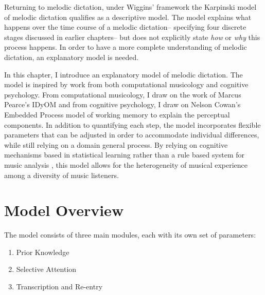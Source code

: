 \documentclass[12pt,]{book}
\providecommand{\tightlist}{%
  \setlength{\itemsep}{0pt}\setlength{\parskip}{0pt}}
\begin{document}
Returning to melodic dictation, under Wiggins' framework the Karpinski model of melodic dictation \citep{karpinskiAuralSkillsAcquisition2000, karpinskiModelMusicPerception1990} qualifies as a descriptive model.
The model explains what happens over the time course of a melodic dictation-- specifying four discrete stages discussed in earlier chapters-- but does not explicitly state \emph{how} or \emph{why} this process happens.
In order to have a more complete understanding of melodic dictation, an explanatory model is needed.

In this chapter, I introduce an explanatory model of melodic dictation.
The model is inspired by work from both computational musicology and cognitive psychology.
From computational musicology, I draw on the work of Marcus Pearce's IDyOM \citep{pearceConstructionEvaluationStatistical2005} and from cognitive psychology, I draw on Nelson Cowan's Embedded Process model of working memory \citep{cowanEvolvingConceptionsMemory1988, cowanMagicalMysteryFour2010} to explain the perceptual components.
In addition to quantifying each step, the model incorporates flexible parameters that can be adjusted in order to accommodate individual differences, while still relying on a domain general process.
By relying on cognitive mechanisms based in statistical learning rather than a rule based system for music analysis \citep{lerdahlGenerativeTheoryTonal1986, narmourAnalysisCognitionBasic1990, narmourAnalysisCognitionMelodic1992, temperleyCognitionBasicMusical2004}, this model allows for the heterogeneity of musical experience among a diversity of music listeners.

\hypertarget{model-overview}{%
\section{Model Overview}\label{model-overview}}

The model consists of three main modules, each with its own set of parameters:

\begin{enumerate}
\def\labelenumi{\arabic{enumi}.}
\tightlist
\item
  Prior Knowledge
\item
  Selective Attention
\item
  Transcription and Re-entry
\end{enumerate}
\end{document}
